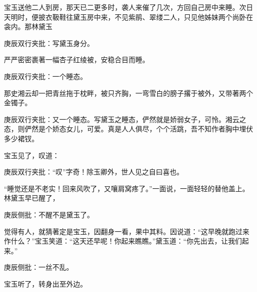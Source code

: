 \begin{parag}
    宝玉送他二人到房，那天已二更多时，袭人来催了几次，方回自己房中来睡。次日天明时，便披衣靸鞋往黛玉房中来，不见紫鹃、翠缕二人，只见他姊妹两个尚卧在衾内。那林黛玉\begin{note}庚辰双行夹批：写黛玉身分。\end{note}严严密密裹著一幅杏子红绫被，安稳合目而睡。\begin{note}庚辰双行夹批：一个睡态。\end{note}那史湘云却一把青丝拖于枕畔，被只齐胸，一弯雪白的膀子撂于被外，又带著两个金镯子。\begin{note}庚辰双行夹批：又一个睡态。写黛玉之睡态，俨然就是娇弱女子，可怜。湘云之态，则俨然是个娇态女儿，可爱。真是人人俱尽，个个活跳，吾不知作者胸中埋伏多少裙钗。\end{note}宝玉见了，叹道：\begin{note}庚辰双行夹批：“叹”字奇！除玉卿外，世人见之自曰喜也。\end{note}“睡觉还是不老实！回来风吹了，又嚷肩窝疼了。”一面说，一面轻轻的替他盖上。林黛玉早已醒了，\begin{note}庚辰侧批：不醒不是黛玉了。\end{note}觉得有人，就猜著定是宝玉，因翻身一看，果中其料。因说道：“这早晚就跑过来作什么？”宝玉笑道：“这天还早呢！你起来瞧瞧。”黛玉道：“你先出去，让我们起来。”\begin{note}庚辰侧批：一丝不乱。\end{note}宝玉听了，转身出至外边。
\end{parag}


